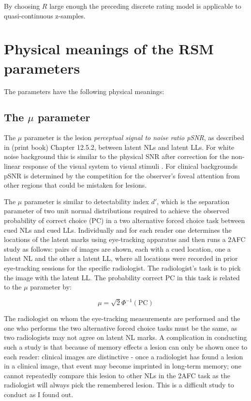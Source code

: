 \documentclass[
]{book}
\begin{document}
By choosing \(R\) large enough the preceding discrete rating model is applicable to quasi-continuous z-samples.

\hypertarget{rsm-parameter-physical-meanings}{%
\section{Physical meanings of the RSM parameters}\label{rsm-parameter-physical-meanings}}

The parameters have the following physical meanings:

\hypertarget{rsm-mu-parameter}{%
\subsection{\texorpdfstring{The \(\mu\) parameter}{The \textbackslash mu parameter}}\label{rsm-mu-parameter}}

The \(\mu\) parameter is the lesion \emph{perceptual signal to noise ratio pSNR}, as described in (print book) Chapter 12.5.2, between latent NLs and latent LLs. For white noise background this is similar to the physical SNR \citep{chakraborty1997computer} after correction for the non-linear response of the visual system to visual stimuli \citep{siddiqui2005discrete}. For clinical backgrounds pSNR is determined by the competition for the observer's foveal attention from other regions that could be mistaken for lesions.

The \(\mu\) parameter is similar to detectability index \(d'\), which is the separation parameter of two unit normal distributions required to achieve the observed probability of correct choice (PC) in a two alternative forced choice task between cued NLs and cued LLs. Individually and for each reader one determines the locations of the latent marks using eye-tracking apparatus and then runs a 2AFC study as follows: pairs of images are shown, each with a cued location, one a latent NL and the other a latent LL, where all locations were recorded in prior eye-tracking sessions for the specific radiologist. The radiologist's task is to pick the image with the latent LL. The probability correct \(\text{PC}\) in this task is related to the \(\mu\) parameter by:

\begin{equation} 
\mu = \sqrt{2} \Phi^{-1} \left ( \text{PC} \right )
\label{eq:rsm-mu-2afc}
\end{equation}

The radiologist on whom the eye-tracking measurements are performed and the one who performs the two alternative forced choice tasks must be the same, as two radiologists may not agree on latent NL marks. A complication in conducting such a study is that because of memory effects a lesion can only be shown once to each reader: clinical images are distinctive - once a radiologist has found a lesion in a clinical image, that event may become imprinted in long-term memory; one cannot repeatedly compare this lesion to other NLs in the 2AFC task as the radiologist will always pick the remembered lesion. This is a difficult study to conduct as I found out.
\end{document}
